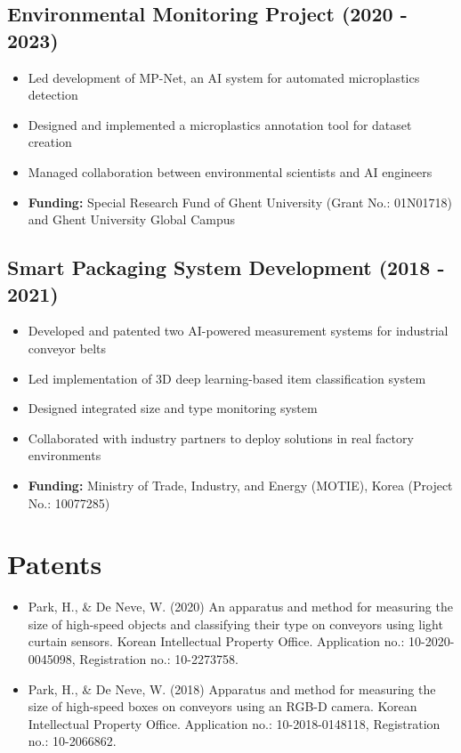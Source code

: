 \documentclass[11pt]{article}
\begin{document}
\subsection{Environmental Monitoring Project (2020 - 2023)}
\begin{itemize}
    \item[\checkmark] Led development of MP-Net, an AI system for automated microplastics detection
    \item[\checkmark] Designed and implemented a microplastics annotation tool for dataset creation
    \item[\checkmark] Managed collaboration between environmental scientists and AI engineers
    \item[\checkmark] \textbf{Funding:} Special Research Fund of Ghent University (Grant No.: 01N01718) and Ghent University Global Campus
\end{itemize}

\subsection{Smart Packaging System Development (2018 - 2021)}
\begin{itemize}
    \item[\checkmark] Developed and patented two AI-powered measurement systems for industrial conveyor belts
    \item[\checkmark] Led implementation of 3D deep learning-based item classification system
    \item[\checkmark] Designed integrated size and type monitoring system
    \item[\checkmark] Collaborated with industry partners to deploy solutions in real factory environments
    \item[\checkmark] \textbf{Funding:} Ministry of Trade, Industry, and Energy (MOTIE), Korea (Project No.: 10077285)
\end{itemize}

\section{Patents}
\begin{itemize}
    \item[\checkmark] Park, H., \& De Neve, W. (2020) An apparatus and method for measuring the size of high-speed objects and classifying their type on conveyors using light curtain sensors. Korean Intellectual Property Office. Application no.: 10-2020-0045098, Registration no.: 10-2273758.
    \item[\checkmark] Park, H., \& De Neve, W. (2018) Apparatus and method for measuring the size of high-speed boxes on conveyors using an RGB-D camera. Korean Intellectual Property Office. Application no.: 10-2018-0148118, Registration no.: 10-2066862.
\end{itemize}
\end{document}
